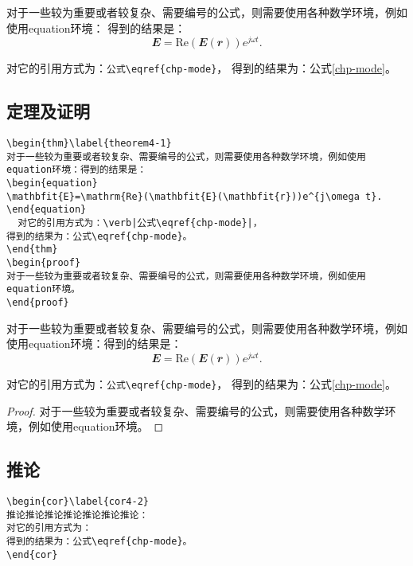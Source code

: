\begin{defn}\label{defn4-1}
对于一些较为重要或者较复杂、需要编号的公式，则需要使用各种数学环境，例如使用equation环境：
得到的结果是：
\begin{equation}
\mathbfit{E}=\mathrm{Re}(\mathbfit{E}(\mathbfit{r}))e^{j\omega t}.
\end{equation}

对它的引用方式为：\verb|公式\eqref{chp-mode}|，
得到的结果为：公式\eqref{chp-mode}。
\end{defn}

\subsection{定理及证明}\label{thm}
\begin{verbatim}
\begin{thm}\label{theorem4-1}
对于一些较为重要或者较复杂、需要编号的公式，则需要使用各种数学环境，例如使用equation环境：得到的结果是：
\begin{equation}
\mathbfit{E}=\mathrm{Re}(\mathbfit{E}(\mathbfit{r}))e^{j\omega t}.
\end{equation}
  对它的引用方式为：\verb|公式\eqref{chp-mode}|，
得到的结果为：公式\eqref{chp-mode}。
\end{thm}
\begin{proof}
对于一些较为重要或者较复杂、需要编号的公式，则需要使用各种数学环境，例如使用equation环境。
\end{proof}
\end{verbatim}

\begin{thm}\label{theorem4-1}
对于一些较为重要或者较复杂、需要编号的公式，则需要使用各种数学环境，例如使用equation环境：得到的结果是：
\begin{equation}
\mathbfit{E}=\mathrm{Re}(\mathbfit{E}(\mathbfit{r}))e^{j\omega t}.
\end{equation}

对它的引用方式为：\verb|公式\eqref{chp-mode}|，
得到的结果为：公式\eqref{chp-mode}。
\end{thm}
\begin{proof}
对于一些较为重要或者较复杂、需要编号的公式，则需要使用各种数学环境，例如使用equation环境。
\end{proof}

\subsection{推论}\label{cor}
\begin{verbatim}
\begin{cor}\label{cor4-2}
推论推论推论推论推论推论推论：
对它的引用方式为：
得到的结果为：公式\eqref{chp-mode}。
\end{cor}
\end{verbatim}

